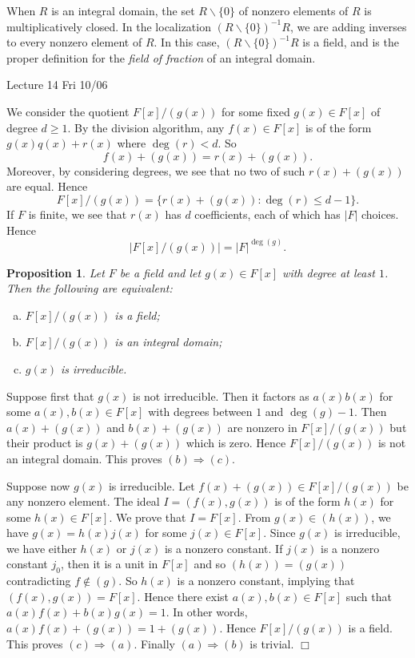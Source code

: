 \documentclass{article}
\newtheorem{proposition}[subsection]{Proposition}
\newenvironment{proof}{\noindent {\bf Proof:}}{$\Box$ \vspace{2 ex}}
\newcommand{\add}[1]{{\color{blue} #1}}
\begin{document}
When $R$ is an integral domain, the set $R\backslash\{0\}$ of nonzero elements of $R$ is multiplicatively closed. In the localization $(R\backslash\{0\})^{-1}R$, we are adding inverses to every nonzero element of $R$. In this case, $(R\backslash\{0\})^{-1}R$ is a field, and is the proper definition for the \textit{field of fraction} of an integral domain.

\begin{center}
    \add{Lecture 14 Fri 10/06}
\end{center}

We consider the quotient $F[x]/(g(x))$ for some fixed $g(x)\in F[x]$ of degree $d\geq 1$. By the division algorithm, any $f(x)\in F[x]$ is of the form $g(x)q(x) + r(x)$ where $\deg(r) < d$. So $$f(x) + (g(x)) = r(x) + (g(x)).$$
Moreover, by considering degrees, we see that no two of such $r(x) + (g(x))$ are equal. Hence
$$F[x]/(g(x)) = \{r(x) + (g(x)) \colon  \deg(r) \leq d-1\}.$$
If $F$ is finite, we see that $r(x)$ has $d$ coefficients, each of which has $|F|$ choices. Hence
$$|F[x]/(g(x))| = |F|^{\deg(g)}.$$

\begin{proposition}\label{prop:F/g}
    Let $F$ be a field and let $g(x)\in F[x]$ with degree at least $1$. Then the following are equivalent:
    \begin{enumerate}[(a)]
        \item $F[x]/(g(x))$ is a field;
        \item $F[x]/(g(x))$ is an integral domain;
        \item $g(x)$ is irreducible.
    \end{enumerate} 
\end{proposition}

\begin{proof}
    Suppose first that $g(x)$ is not irreducible. Then it factors as $a(x)b(x)$ for some $a(x),b(x)\in F[x]$ with degrees between $1$ and $\deg(g) - 1$. Then $a(x) + (g(x))$ and $b(x) + (g(x))$ are nonzero in $F[x]/(g(x))$ but their product is $g(x) + (g(x))$ which is zero. Hence $F[x]/(g(x))$ is not an integral domain. This proves $(b)\Rightarrow(c).$ 
    
    Suppose now $g(x)$ is irreducible. Let $f(x)+(g(x))\in F[x]/(g(x))$ be any nonzero element. The ideal $I = (f(x),g(x))$ is of the form $h(x)$ for some $h(x)\in F[x]$. We prove that $I = F[x]$. From $g(x)\in (h(x))$, we have $g(x) = h(x)j(x)$ for some $j(x)\in F[x]$. Since $g(x)$ is irreducible, we have either $h(x)$ or $j(x)$ is a nonzero constant. If $j(x)$ is a nonzero constant $j_0$, then it is a unit in $F[x]$ and so $(h(x)) = (g(x))$ contradicting $f\notin (g)$. So $h(x)$ is a nonzero constant, implying that $(f(x),g(x)) = F[x]$. Hence there exist $a(x),b(x)\in F[x]$ such that $a(x)f(x) + b(x)g(x) = 1$. In other words, $a(x)f(x) + (g(x)) = 1 + (g(x)).$ Hence $F[x]/(g(x))$ is a field. This proves $(c)\Rightarrow(a)$. Finally $(a)\Rightarrow(b)$ is trivial.
\end{proof}
\end{document}
